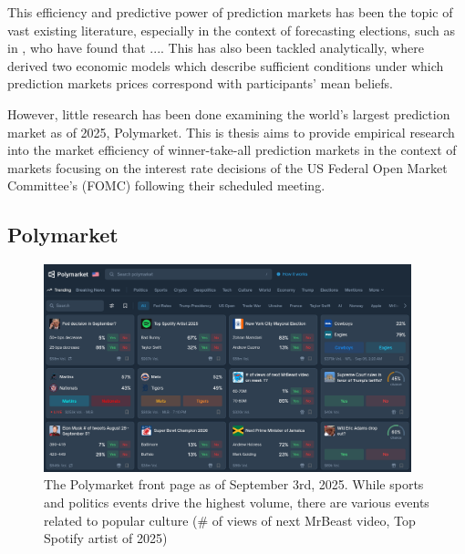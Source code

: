


This efficiency and predictive power of prediction markets has been the topic
of vast existing literature, especially in the context of forecasting elections, such as in
\cite{berg_prediction_2008} \cite{erikson_are_2008}, who have found that .... 
This has also been tackled analytically, where \cite{wolfers_interpreting_2006} derived two economic models which
describe sufficient conditions under which prediction markets prices correspond with participants' mean beliefs.

However, little research has been done examining the world's largest prediction market as of 2025, Polymarket.
This is thesis aims to provide empirical research into the market efficiency of winner-take-all prediction markets 
in the context of markets focusing on the interest rate decisions of the US Federal Open Market Committee's (FOMC) following their scheduled meeting.

\newpage

\subsection{Polymarket}

\begin{figure}[H]
  \begin{center}
    \includegraphics[width=0.95\textwidth]{figures/Polymarket_front_page.png}
  \end{center}
  \caption{The Polymarket front page as of September 3rd, 2025. While sports and politics events drive the highest volume, there are various events related to popular culture (\# of views of next MrBeast video, Top Spotify artist of 2025)}
  \label{fig:front_page}
\end{figure}

